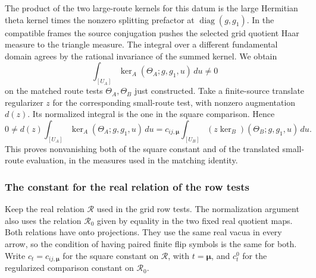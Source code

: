 The product of the two large-route kernels for this
datum is the large Hermitian theta kernel times the
nonzero splitting prefactor at \(\operatorname{diag}(g,g_1)\).
In the compatible frames the source conjugation
pushes the selected grid quotient Haar measure to the
triangle measure. The integral over a different
fundamental domain agrees by the rational invariance
of the summed kernel. We obtain
\[
 \int_{[U_A]} \ker_A(\Theta_A;g,g_1,u)\,du\ne0
\]
on the matched route tests \(\Theta_A,\Theta_B\)
just constructed. Take a finite-source translate
regularizer \(z\) for the corresponding small-route
test, with nonzero augmentation \(d(z)\).
Its normalized integral is the one in the square
comparison. Hence
\[
 0\ne d(z)\int_{[U_A]}\ker_A(\Theta_A;g,g_1,u)\,du
   =c_{ij,\boldsymbol\mu}
      \int_{[U_B]} (z\ker_B)(\Theta_B;g,g_1,u)\,du .
\]
This proves nonvanishing both of the square constant
and of the translated small-route evaluation, in the
measures used in the matching identity.

\subsubsection{The constant for the real relation of the row tests}
Keep the real relation \(\mathscr R\) used in the grid
row tests. The normalization argument also uses the
relation \(\mathscr R_0\) given by equality in the two
fixed real quotient maps. Both relations have onto
projections. They use the same real vacua in every
arrow, so the condition of having paired finite flip
symbols is the same for both. Write
\(c_t=c_{ij,\boldsymbol\mu}\) for the square constant
on \(\mathscr R\), with \(t=\boldsymbol\mu\), and
\(c_t^0\) for the regularized comparison constant on
\(\mathscr R_0\).

